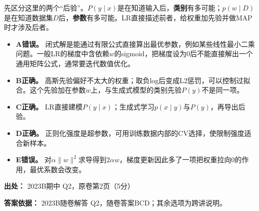 先区分这里的两个“后验”。\(P(y\mid x)\)是在知道输入后，\textbf{类别}有多可能；\(p(w\mid D)\)是在知道数据集\(D\)后，\textbf{参数}有多可能。LR直接描述前者，给权重加先验并做MAP时才涉及后者。



\begin{itemize}

\item \textbf{A错误。} 闭式解是能通过有限公式直接算出最优参数，例如某些线性最小二乘问题。一般LR的梯度中含依赖\(w\)的sigmoid，把梯度设为0后不能直接解出一个通用矩阵公式，通常要迭代数值优化。

\item \textbf{B正确。} 高斯先验偏好不太大的权重；取负log后变成L2惩罚，可以控制过拟合。这个先验加在参数\(w\)上，与生成式模型的类别先验\(P(y)\)不是同一项。

\item \textbf{C正确。} LR直接建模\(P(y\mid x)\)；生成式学习\(p(x\mid y)\)与\(P(y)\)，再导出后验。

\item \textbf{D正确。} 正则化强度是超参数，可用训练数据内部的CV选择，使限制强度适合新样本。

\item \textbf{E错误。} 对\(\alpha\|w\|^2\)求导得到\(2\alpha w\)，梯度更新因此多了一项把权重拉向0的作用，最优系数会改变。

\end{itemize}


\textbf{出处：} 2023B期中 Q2，原卷第2页（5分）


\textbf{答案依据：} 2023B随卷解答 Q2，随卷答案BCD；其余选项为跨讲说明。
